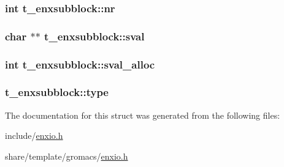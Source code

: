 \hypertarget{structt__enxsubblock_a891afb91f9bc8cbbfe50f75d526ae823}{
\subsubsection[{nr}]{\setlength{\rightskip}{0pt plus 5cm}int {\bf t\-\_\-enxsubblock\-::nr}}}\label{structt__enxsubblock_a891afb91f9bc8cbbfe50f75d526ae823}
\hypertarget{structt__enxsubblock_a4542514937b3aa9b7174618b4ae08f11}{
\subsubsection[{sval}]{\setlength{\rightskip}{0pt plus 5cm}char $\ast$$\ast$ {\bf t\-\_\-enxsubblock\-::sval}}}\label{structt__enxsubblock_a4542514937b3aa9b7174618b4ae08f11}
\hypertarget{structt__enxsubblock_ae10ae467cda055b482675c2e7dbe0f45}{
\subsubsection[{sval\-\_\-alloc}]{\setlength{\rightskip}{0pt plus 5cm}int {\bf t\-\_\-enxsubblock\-::sval\-\_\-alloc}}}\label{structt__enxsubblock_ae10ae467cda055b482675c2e7dbe0f45}
\hypertarget{structt__enxsubblock_a9cedf8d9f106f37d632285883e8dba7e}{
\subsubsection[{type}]{ {\bf t\-\_\-enxsubblock\-::type}}}\label{structt__enxsubblock_a9cedf8d9f106f37d632285883e8dba7e}


\-The documentation for this struct was generated from the following files\-:\begin{DoxyCompactItemize}
\item 
include/\hyperlink{include_2enxio_8h}{enxio.\-h}\item 
share/template/gromacs/\hyperlink{share_2template_2gromacs_2enxio_8h}{enxio.\-h}\end{DoxyCompactItemize}
